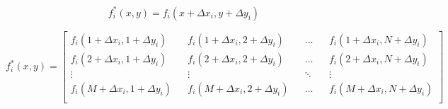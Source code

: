 \documentclass[../main.tex]{subfiles}%
\begin{document}
%
    \Xequation%
    \begin{equation*}%
        f_{i}^{*}(x,y)%
        =%
        f_{i}(x+\Delta x_{i},y+\Delta y_{i})%
    \end{equation*}%
    \par%
    \begin{equation}%
        f_{i}^{*}(x,y) =%
        \begin{bmatrix}%
            f_{i}(1+\Delta x_{i},1+\Delta y_{i}) && f_{i}(1+\Delta x_{i},2+\Delta y_{i}) && \dots && f_{i}(1+\Delta x_{i},N+\Delta y_{i}) \\%
            f_{i}(2+\Delta x_{i},1+\Delta y_{i}) && f_{i}(2+\Delta x_{i},2+\Delta y_{i}) && \dots && f_{i}(2+\Delta x_{i},N+\Delta y_{i}) \\%
            \vdots && \vdots && \ddots && \vdots \\%
            f_{i}(M+\Delta x_{i},1+\Delta y_{i}) && f_{i}(M+\Delta x_{i},2+\Delta y_{i}) && \dots && f_{i}(M+\Delta x_{i},N+\Delta y_{i}) \\%
        \end{bmatrix}%
        \label{eq:mosaic-stitch-shifted-function}%
    \end{equation}%
\end{document}
